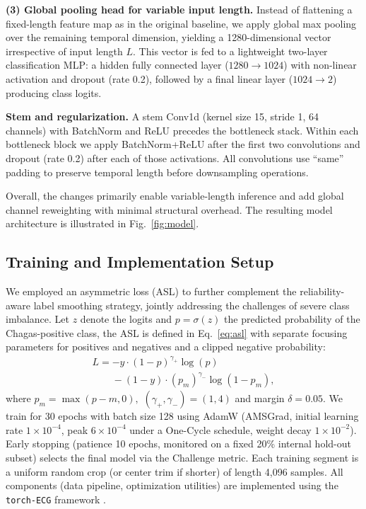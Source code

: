 \textbf{(3) Global pooling head for variable input length.} Instead of flattening a fixed-length feature map as in the original baseline, we apply global max pooling over the remaining temporal dimension, yielding a 1280-dimensional vector irrespective of input length $L$. This vector is fed to a lightweight two-layer classification MLP: a hidden fully connected layer ($1280 \to 1024$) with non-linear activation and dropout (rate 0.2), followed by a final linear layer ($1024 \to 2$) producing class logits.

\textbf{Stem and regularization.} A stem Conv1d (kernel size 15, stride 1, 64 channels) with BatchNorm and ReLU precedes the bottleneck stack. Within each bottleneck block we apply BatchNorm+ReLU after the first two convolutions and dropout (rate 0.2) after each of those activations. All convolutions use “same” padding to preserve temporal length before downsampling operations.

Overall, the changes primarily enable variable-length inference and add global channel reweighting with minimal structural overhead. The resulting model architecture is illustrated in Fig.~\ref{fig:model}.


\subsection{Training and Implementation Setup}
\label{subsec:train}


We employed an asymmetric loss (ASL) \cite{ridnik2021asymmetric_loss} to further complement the reliability-aware label smoothing strategy, jointly addressing the challenges of severe class imbalance. Let $z$ denote the logits and $p=\sigma(z)$ the predicted probability of the Chagas-positive class, the ASL is defined in Eq.~\ref{eq:asl} with separate focusing parameters for positives and negatives and a clipped negative probability:
\begin{equation}
\label{eq:asl}
\begin{multlined}
L = -y \cdot (1-p)^{\gamma_{+}} \log(p) \\
\phantom{L = } - (1-y) \cdot (p_m)^{\gamma_{-}} \log(1-p_m),
\end{multlined}
\end{equation}
where $p_m = \max(p - m, 0),$ $(\gamma_{+},\gamma_{-})=(1,4)$ and margin $\delta=0.05$. We train for 30 epochs with batch size 128 using AdamW (AMSGrad, initial learning rate $1\times10^{-4}$, peak $6\times10^{-4}$ under a One-Cycle schedule, weight decay $1\times10^{-2}$). Early stopping (patience 10 epochs, monitored on a fixed 20\% internal hold-out subset) selects the final model via the Challenge metric. Each training segment is a uniform random crop (or center trim if shorter) of length 4,096 samples. All components (data pipeline, optimization utilities) are implemented using the \texttt{torch-ECG} framework \cite{torch_ecg_paper}.
